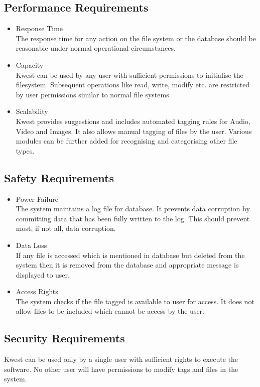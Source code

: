 \subsection {Performance Requirements}
\begin {itemize}
\item Response Time \\
The response time for any action on the file system or the database should be reasonable under normal operational circumstances. 
\item Capacity \\
Kwest can be used by any user with sufficient permissions to initialise the filesystem. Subsequent operations like read, write, modify etc. are restricted by user permissions similar to normal file systems.
\item Scalability \\
Kwest provides suggestions and includes automated tagging rules for Audio, Video and Images. It also allows manual tagging of files by the user. Various modules can be further added for recognising and categorising other file types.
\end{itemize}

\subsection {Safety Requirements}
\begin{itemize}
\item Power Failure \\
The system maintains a log file for database. It prevents data corruption by committing data that has been fully written to the log. This should prevent most, if not all, data corruption.
\item Data Loss \\
If any file is accessed which is mentioned in database but deleted from the system then it is removed from the database and appropriate message is displayed to user.
\item Access Rights \\
The system checks if the file tagged is available to user for access. It does not allow files to be included which cannot be access by the user.
\end{itemize}

\subsection {Security Requirements}
Kwest can be used only by a single user with sufficient rights to execute the software. No other user will have permissions to modify tags and files in the system.

